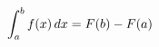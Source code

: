 \documentclass[preview]{standalone}
\begin{document}
\begin{align*}
\special{dvisvgm:raw <g id='unique000'>}\int_a^b f(x)\,dx = F(b) - F(a)\special{dvisvgm:raw </g>}
\end{align*}
\end{document}
